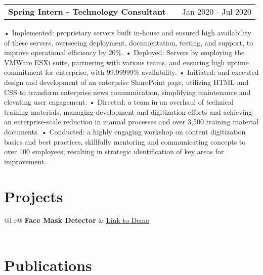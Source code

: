 \documentclass[a4paper,12pt]{article}
\makeatletter
\newenvironment{joblong}[2]
    {
    \begin{tabularx}{\linewidth}{@{}l X r@{}}
    \textbf{#1} & \hfill &  #2 \\[3.75pt]
    \end{tabularx}
    \begin{minipage}[t]{\linewidth}
    \begin{itemize}[nosep,after=\strut, leftmargin=1em, itemsep=3pt,label=--]
    }
    {
    \end{itemize}
    \end{minipage}    
    }
\makeatother
\begin{document}
\begin{joblong}{Spring Intern - Technology Consultant}{Jan 2020 - Jul 2020}
• Implemented: proprietary servers built in-house and ensured high availability of these servers, overseeing deployment, documentation, testing, and support, to improve operational efficiency by 20\%.
• Deployed: Servers by employing the VMWare ESXi suite, partnering with various teams, and ensuring high uptime commitment for enterprise, with 99.99999\% availability.
• Initiated: and executed design and development of an enterprise SharePoint page, utilizing HTML and CSS to transform enterprise news communication, simplifying maintenance and elevating user engagement.
• Directed: a team in an overhaul of technical training materials, managing development and digitization efforts and achieving an enterprise-scale reduction in manual processes and over 3,500 training material documents.
• Conducted: a highly engaging workshop on content digitization basics and best practices, skillfully mentoring and communicating concepts to over 100 employees, resulting in strategic identification of key areas for improvement.
\end{joblong}
  
\section{Projects}

\begin{tabularx}{\linewidth}{ @{}l r@{} }
\textbf{Face Mask Detector} & \hfill \href{https://some-link.com}{Link to Demo} \\[3.75pt]
  \\
\end{tabularx}


\section{Publications}
\begin{refsection}
\nocite{*}
\printbibliography[heading=none]
\end{refsection}
\end{document}
